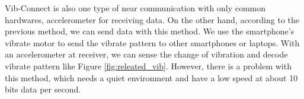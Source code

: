 Vib-Connect \cite{vibconnect} is also one type of near communication with only common hardwares, accelerometer for receiving data. On the other hand, according to the previous method, we can send data with this method. We use the smartphone's vibrate motor to send the vibrate pattern to other smartphones or laptops. With an accelerometer at receiver, we can sense the change of vibration and decode vibrate pattern like Figure \ref{fig:releated_vib}. However, there is a problem with this method, which needs a quiet environment and have a low speed at about 10 bits data per second.

%
%
%
%
%
%
%
%

